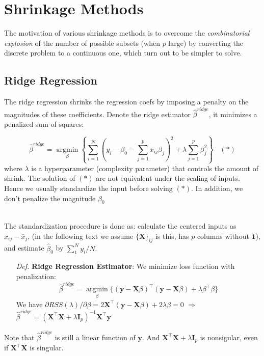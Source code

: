 \documentclass[a4paper, 11pt]{article}
\DeclareMathOperator*{\argmin}{argmin}
\begin{document}
\section{Shrinkage Methods}
The motivation of various shrinkage methods is to overcome the \emph{combinatorial explosion} of the number of possible subsets (when $p$ large) by converting the discrete problem to a continuous one, which turn out to be simpler to solve.
\subsection{Ridge Regression}
The ridge regression shrinks the regression coefs by imposing a penalty on the magnitudes of these coefficients. Denote the ridge estimator $\hat{\beta}^{ridge}$, it minimizes a penalized sum of squares:

$$
\hat{\beta}^{ridge} = \argmin\limits_{\beta} \left\{\sum_{i=1}^N (y_i - \beta_0 - \sum_{j=1}^p x_{ij}\beta_j)^2 + \lambda \sum_{j=1}^p \beta_j^2\right\}~~~~(*)
$$
where $\lambda$ is a hyperparameter (complexity parameter) that controls the amount of shrink. The solution of $(*)$ are not equivalent under the scaling of inputs. Hence we usually standardize the input before solving $(*)$. In addition, we don't penalize the magnitude $\beta_0$

~\\
The standardization procedure is done as: calculate the centered inputs as $x_{ij}-\bar{x}_j$, (in the following text we assume $\{\bm{X}\}_{ij}$ is this, has $p$ columns without $\bm{1}$), and estimate $\hat{\beta}_0$ by $\sum_{1}^N y_i/N$.
~\\
\begin{itemize}
	\item[\textit{Def.}] \textbf{Ridge Regression Estimator}: We minimize loss function with penalization:
	$$
	\hat{\beta}^{ridge} = \argmin\limits_{\beta} \{(\bm{y} - \bm{X}\beta)^{\top}(\bm{y} - \bm{X}\beta) + \lambda \beta^{\top} \beta\}
	$$
	We have $\partial RSS(\lambda)/\partial \beta = 2\bm{X}^{\top}(\bm{y} - \bm{X}\beta) + 2 \lambda \beta = 0$ $\Rightarrow$ $\hat{\beta}^{ridge} = (\bm{X}^{\top}\bm{X}+\lambda \bm{I}_p)^{-1} \bm{X}^{\top} \bm{y}$
\end{itemize}
Note that $\hat{\beta}^{ridge}$ is still a linear function of $\bm{y}$. And $\bm{X}^{\top}\bm{X}+\lambda \bm{I}_p$ is nonsigular, even if $\bm{X}^{\top} \bm{X}$ is singular.
\end{document}
